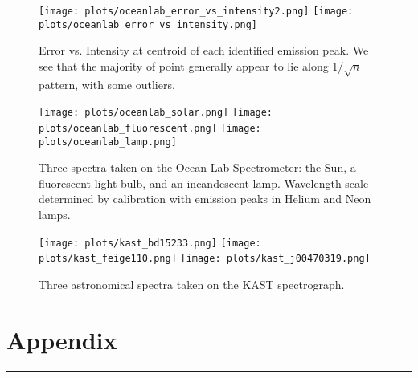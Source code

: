 \documentclass[preprint]{aastex62}
\begin{document}
\begin{figure}[H]
\begin{center}
\texttt{[image: plots/oceanlab\_error\_vs\_intensity2.png]}
\texttt{[image: plots/oceanlab\_error\_vs\_intensity.png]}
\caption{Error vs. Intensity at centroid of each identified emission peak. We see that the majority of point generally appear to lie along 1/$\sqrt{n}$ pattern, with some outliers.} \label{fig:error_vs_intensity}
\end{center}
\end{figure}

\begin{figure}[H]
\begin{center}
\texttt{[image: plots/oceanlab\_solar.png]}
\texttt{[image: plots/oceanlab\_fluorescent.png]}
\texttt{[image: plots/oceanlab\_lamp.png]}
\caption{Three spectra taken on the Ocean Lab Spectrometer: the Sun, a fluorescent light bulb, and an incandescent lamp. Wavelength scale determined by calibration with emission peaks in Helium and Neon lamps.} \label{fig:oceanlab_specs}
\end{center}
\end{figure}

\begin{figure}[H]
\begin{center}
\texttt{[image: plots/kast\_bd15233.png]}
\texttt{[image: plots/kast\_feige110.png]}
\texttt{[image: plots/kast\_j00470319.png]}
\caption{Three astronomical spectra taken on the KAST spectrograph.} \label{fig:kast_specs}
\end{center}
\end{figure}
\newpage
\section{Appendix}


\vspace{7pt} \hrule \vspace{7pt}
\end{document}
